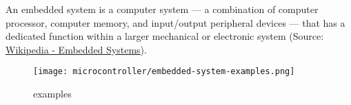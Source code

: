 \begin{frame}
    \begin{definition}
        An embedded system is a computer system --- a combination of computer processor, computer memory, and input/output peripheral devices --- that has a dedicated function within a larger mechanical or electronic system (Source: \href{https://en.wikipedia.org/wiki/Embedded_system}{Wikipedia - Embedded Systems}).
    \end{definition}
    \vspace{-1em}
    \begin{figure}
        \texttt{[image: microcontroller/embedded-system-examples.png]}
        \caption{ examples}
    \end{figure}
\end{frame}